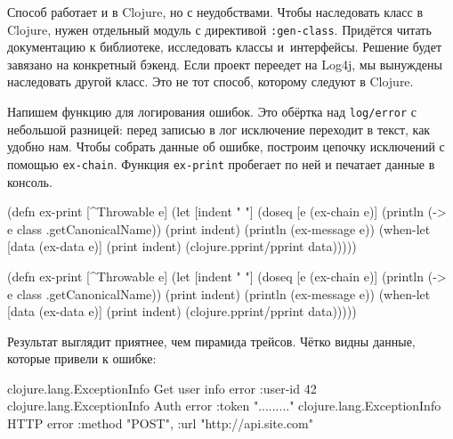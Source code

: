 Способ работает и в Clojure, но с неудобствами. Чтобы наследовать класс в
Clojure, нужен отдельный модуль с директивой \verb|:gen-class|. Придётся
читать документацию к библиотеке, исследовать классы и~интерфейсы. Решение будет
завязано на конкретный бэкенд. Если проект переедет на Log4j, мы вынуждены
наследовать другой класс. Это не тот способ, которому следуют в Clojure.

Напишем функцию для логирования ошибок. Это обёртка над \verb|log/error| с
небольшой разницей: перед записью в лог исключение переходит в текст, как удобно
нам. Чтобы собрать данные об ошибке, построим цепочку исключений с помощью
\verb|ex-chain|. Функция \verb|ex-print| пробегает по ней и печатает данные в
консоль.


\ifx\devicetype\mobile

\begin{english}
  \begin{clojure}
(defn ex-print
  [^Throwable e]
  (let [indent "  "]
    (doseq [e (ex-chain e)]
      (println (-> e
                   class
                   .getCanonicalName))
      (print indent)
      (println (ex-message e))
      (when-let [data (ex-data e)]
        (print indent)
        (clojure.pprint/pprint data)))))
  \end{clojure}
\end{english}

\else

\begin{english}
  \begin{clojure}
(defn ex-print
  [^Throwable e]
  (let [indent "  "]
    (doseq [e (ex-chain e)]
      (println (-> e class .getCanonicalName))
      (print indent)
      (println (ex-message e))
      (when-let [data (ex-data e)]
        (print indent)
        (clojure.pprint/pprint data)))))
  \end{clojure}
\end{english}

\fi

Результат выглядит приятнее, чем пирамида трейсов. Чётко видны данные,
которые привели к ошибке:

\ifx\devicetype\mobile

\begin{english}
  \begin{clojure}
clojure.lang.ExceptionInfo
  Get user info error
  {:user-id 42}
clojure.lang.ExceptionInfo
  Auth error
  {:token "........."}
clojure.lang.ExceptionInfo
  HTTP error
  {:method "POST",
   :url "http://api.site.com"}
  \end{clojure}
\end{english}

